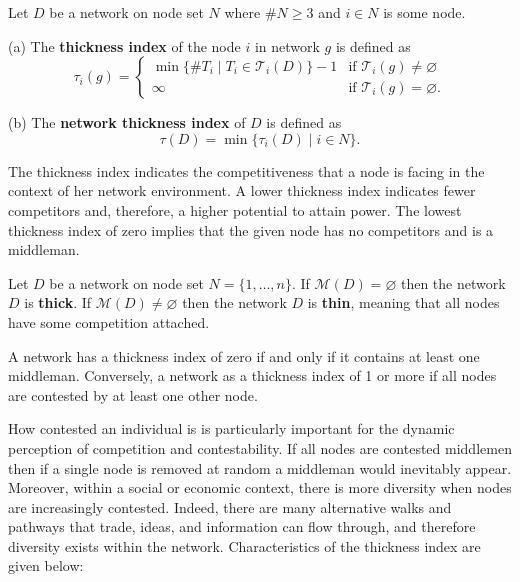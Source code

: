 \begin{definition}
Let $D$ be a network on node set $N$ where $\# N \geqslant 3$ and $i \in N$ is some node.

\begin{abet}
\item[(a)] The \textbf{thickness index} of the node $i$ in network $g$ is defined as
\[ 
\tau_{i}(g) = \left\{ \begin{array}{ll}
              \min \{\# T_{i} \mid T_{i} \in \mathcal{T}_{i}(D)\} - 1 & \mbox{if $\mathcal{T}_{i}(g) \neq \varnothing$}\\
         	 \infty & \mbox{if $\mathcal{T}_{i}(g) = \varnothing$}.\end{array} \right. 
\]
\item[(b)] The \textbf{network thickness index} of $D$ is defined as
\begin{equation*}
\tau(D) = \min \{ \tau_{i}(D) \mid i \in N \} . 
\end{equation*}
\end{abet}
\end{definition}

The thickness index indicates the competitiveness that a node is facing in the context of her network environment. A lower thickness index indicates fewer competitors and, therefore, a higher potential to attain power. The lowest thickness index of zero implies that the given node has no competitors and is a middleman.

\begin{definition}
Let $D$ be a network on node set $N=\{1, \ldots, n\}$. If $\mathcal{M}(D) = \varnothing$ then the network $D$ is \textbf{thick}. If $\mathcal{M}(D) \neq \varnothing$ then the network $D$ is \textbf{thin}, meaning that all nodes have some competition attached.
\end{definition}

A network has a thickness index of zero if and only if it contains at least one middleman. Conversely, a network as a thickness index of 1 or more if all nodes are contested by at least one other node.

How contested an individual is is particularly important for the dynamic perception of competition and contestability. If all nodes are contested middlemen then if a single node is removed at random a middleman would inevitably appear. Moreover, within a social or economic context, there is more diversity when nodes are increasingly contested. Indeed, there are many alternative walks and pathways that trade, ideas, and information can flow through, and therefore diversity exists within the network. Characteristics of the thickness index are given below:


